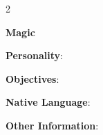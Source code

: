 \documentclass[10pt]{article}
\begin{document}
\begin{multicols}{2}
\hrulefill


\hrulefill


\hrulefill


\hrulefill


\hrulefill


\hrulefill


\hrulefill



\columnbreak

\vspace*{24pt}

\textbf{Magic }




\hrulefill


\hrulefill


\hrulefill


\hrulefill


\hrulefill


\hrulefill


\hrulefill


\hrulefill


\hrulefill


\hrulefill


\hrulefill


\hrulefill


\hrulefill


\hrulefill


\hrulefill


\vspace{24pt}

\textbf{Personality}: \hrulefill

\hrulefill

\hrulefill

\hrulefill

\textbf{Objectives}: \hrulefill

\hrulefill

\hrulefill


\textbf{Native Language}: \hrulefill

\hrulefill

\textbf{Other Information}: \hrulefill

\hrulefill

\hrulefill

\hrulefill

\hrulefill

\hrulefill

\end{multicols}
\end{document}
